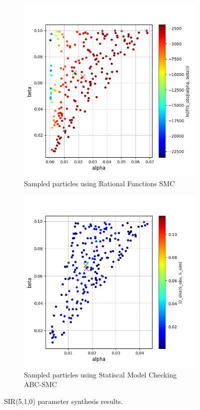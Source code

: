 \begin{figure}[H]
    \centering
    \begin{subfigure}{0.48\textwidth}
        \centering
        \includegraphics[width=\linewidth]{figures/sir510_rfsmc.png}
        \caption{Sampled particles using Rational Functions SMC}
    \end{subfigure}
    \hfill
    \begin{subfigure}{0.48\textwidth}
        \centering
        \includegraphics[width=\linewidth]{figures/sir510_abcsmc.png}
        \caption{Sampled particles using Statiscal Model Checking ABC-SMC}
    \end{subfigure}
    \caption{SIR(5,1,0) parameter synthesis results.}
\end{figure}

